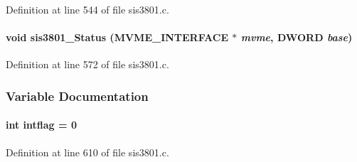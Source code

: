 Definition at line 544 of file sis3801.c.
\paragraph[{sis3801\_\-Status}]{\setlength{\rightskip}{0pt plus 5cm}void sis3801\_\-Status ({\bf MVME\_\-INTERFACE} $\ast$ {\em mvme}, \/  {\bf DWORD} {\em base})}\hfill\label{sis3801_8c_a4473c083ae5a19014277e1c3f556a0ef}


Definition at line 572 of file sis3801.c.

\subsubsection{Variable Documentation}
\paragraph[{intflag}]{\setlength{\rightskip}{0pt plus 5cm}int {\bf intflag} = 0}\hfill\label{sis3801_8c_af04b8670f9eb7a42f73148ced267ab35}


Definition at line 610 of file sis3801.c.